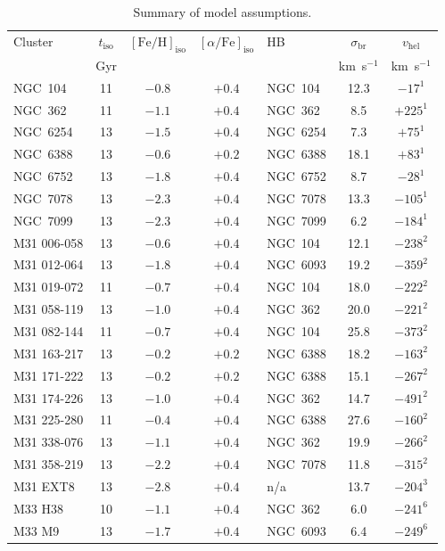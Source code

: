 \documentclass{aa}
\begin{document}
\begin{table*}
\caption{Summary of model assumptions.}
\label{tab:assump}
\centering
{\small
\begin{tabular}{lccclcc}
\hline\hline
Cluster & $t_\mathrm{iso}$ & $\mathrm{[Fe/H]}_\mathrm{iso}$ & $[\alpha/\mathrm{Fe}]_\mathrm{iso}$ & HB & $\sigma_\mathrm{br}$  & $v_\mathrm{hel}$  \\
& Gyr & & & & km~s$^{-1}$ & km~s$^{-1}$ \\
\hline
NGC~104  & 11 & $-0.8$ & $+0.4$ & NGC~104 & 12.3 & $-17^1$ \\
NGC~362  & 11 & $-1.1$ & $+0.4$ & NGC~362 & 8.5 & $+225^1$ \\
NGC~6254 & 13 & $-1.5$ & $+0.4$ & NGC~6254 & 7.3 & $+75^1$ \\
NGC~6388 & 13 & $-0.6$ & $+0.2$ & NGC~6388 & 18.1 & $+83^1$ \\
NGC~6752 & 13 & $-1.8$ & $+0.4$ & NGC~6752 & 8.7 & $-28^1$ \\
NGC~7078 & 13 & $-2.3$ & $+0.4$ & NGC~7078 & 13.3 & $-105^1$ \\
NGC~7099 & 13 & $-2.3$ & $+0.4$ & NGC~7099 & 6.2 & $-184^1$ \\
M31 006-058 & 13 & $-0.6$ & $+0.4$ & NGC~104 & 12.1 & $-238^2$ \\
M31 012-064 & 13 & $-1.8$ & $+0.4$ & NGC~6093 & 19.2 & $-359^2$ \\
M31 019-072 & 11 & $-0.7$ & $+0.4$ & NGC~104 & 18.0 & $-222^2$ \\
M31 058-119 & 13 & $-1.0$ & $+0.4$ & NGC~362 & 20.0 & $-221^2$ \\
M31 082-144 & 11 & $-0.7$ & $+0.4$ & NGC~104 & 25.8 & $-373^2$ \\
M31 163-217 & 13 & $-0.2$ & $+0.2$ & NGC~6388 & 18.2 & $-163^2$ \\
M31 171-222 & 13 & $-0.2$ & $+0.2$ & NGC~6388 & 15.1 & $-267^2$ \\
M31 174-226 & 13 & $-1.0$ & $+0.4$ & NGC~362 & 14.7 & $-491^2$ \\
M31 225-280 & 11 & $-0.4$ & $+0.4$ & NGC~6388 & 27.6 & $-160^2$ \\
M31 338-076 & 13 & $-1.1$ & $+0.4$ & NGC~362 & 19.9 & $-266^2$ \\
M31 358-219 & 13 & $-2.2$ & $+0.4$ & NGC~7078 & 11.8 & $-315^2$ \\
M31 EXT8 & 13 & $-2.8$ & $+0.4$ & n/a & 13.7 & $-204^3$ \\
M33 H38   & 10 & $-1.1$ & $+0.4$ & NGC~362 & 6.0 & $-241^6$ \\
M33 M9    & 13 & $-1.7$ & $+0.4$ & NGC~6093 & 6.4 & $-249^6$ \\

\end{tabular}}
\end{table*}
\end{document}
